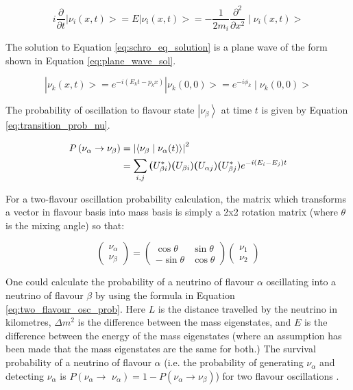 \begin{equation}
i \frac{\partial}{\partial t}\left|\nu_{i}(x, t)>=E\right| \nu_{i}(x, t)>=-\frac{1}{2 m_{i}} \frac{\partial^{2}}{\partial x^{2}} \mid \nu_{i}(x, t)>
\label{eq:schro_eq_solution}   
\end{equation}

The solution to Equation \ref{eq:schro_eq_solution} is a plane wave of the form shown in Equation \ref{eq:plane_wave_sol}.

\begin{equation}
\left|\nu_{k}(x, t)>=e^{-i\left(E_{k} t-p_{k} x\right)}\right| \nu_{k}(0,0)>=e^{-i \phi_{k}} \mid \nu_{k}(0,0)>
\label{eq:plane_wave_sol}
\end{equation}

The probability of oscillation to flavour state $\left|\nu_{\beta}\right\rangle$ at time $t$ is given by Equation \ref{eq:transition_prob_nu}. 


\begin{align}
P\left(\nu_{\alpha} \rightarrow \nu_{\beta}\right) &=\left|\left\langle\nu_{\beta} \mid \nu_{\alpha}(t)\right\rangle\right|^{2} \label{eq:transition_prob_nu}\\
&=\sum_{i, j} \boldsymbol(U_{\beta i}^{*})\boldsymbol(U_{\beta i})\boldsymbol(U_{\alpha j})\boldsymbol(U_{\beta j}^{*}) e^{-i\left(E_{i}-E_{j}\right) t} \notag
\end{align}



For a two-flavour oscillation probability calculation, the matrix which transforms a vector in flavour basis into mass basis is simply a 2x2 rotation matrix (where $\theta$ is the mixing angle) so that:

$$
\left(\begin{array}{l}
\nu_{\alpha} \\
\nu_{\beta}
\end{array}\right)=\left(\begin{array}{cc}
\cos \theta & \sin \theta \\
-\sin \theta & \cos \theta
\end{array}\right)\left(\begin{array}{l}
\nu_{1} \\
\nu_{2}
\end{array}\right)
\label{eq:rotation matrix}
$$


One could calculate the probability of a neutrino of flavour $\alpha$ oscillating into a neutrino of flavour $\beta$ by using the formula in Equation \ref{eq:two_flavour_osc_prob}. Here $L$ is the distance travelled by the neutrino in kilometres, $\Delta m^{2}$ is the difference between the mass eigenstates, and $E$ is the difference between the energy of the mass eigenstates (where an assumption has been made that the mass eigenstates are the same for both.) The survival probability of a neutrino of flavour $\alpha$ (i.e. the probability of generating $\nu_{\alpha}$ and detecting $\nu_{\alpha}$ is $P\left(\nu_{\alpha} \rightarrow\right.$ $\left.\nu_{\alpha}\right)=1-P\left(\nu_{\alpha} \rightarrow \nu_{\beta}\right)$) for two flavour oscillations \cite{RevModPhys.59.671}. 

